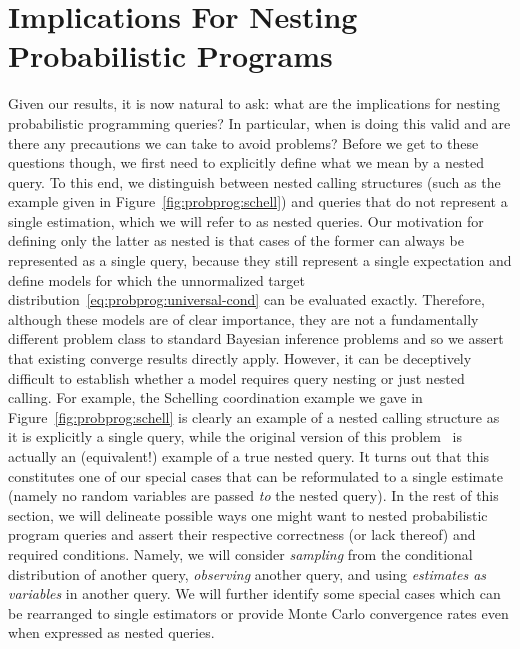 
\section{Implications For Nesting Probabilistic Programs}
\label{sec:nest:imp}

Given our results, it is now natural to ask: what are the implications for nesting probabilistic programming queries?
In particular, when is doing
this valid and are there any precautions we can take to avoid problems?  Before
we get to these questions though, we first need to explicitly define what we
mean by a nested query.  To this end, we distinguish between nested calling
structures (such as the example given in Figure~\ref{fig:probprog:schell}) and
queries that do not represent a single estimation, which we will refer
to as nested queries. Our motivation for defining only the latter
as nested is that cases of the former can always be represented as a single
query, because they still represent a single expectation and define models
for which the unnormalized target distribution~\eqref{eq:probprog:universal-cond}
 can be evaluated exactly.  Therefore, although these models are
of clear importance, they are not a fundamentally different problem class
to standard Bayesian inference problems and so we assert that existing \mc
converge results directly apply.  However, it can be deceptively difficult to establish
whether a model requires query nesting or just nested calling.
For example, the Schelling coordination example we gave in Figure~\ref{fig:probprog:schell}
is clearly an example of a nested calling structure as it is explicitly a single query,
while the original version of this problem~\cite[Figure 6]{stuhlmuller2014reasoning}
is actually an (equivalent!) example of a true nested query.  It turns out that this
constitutes one of our special cases that can be reformulated to a single estimate (namely
no random variables are passed \emph{to} the nested query).
In the rest of this section, we will delineate possible ways one might want
to nested probabilistic program queries and
assert their respective correctness (or lack thereof) and required conditions.
Namely, we will consider \emph{sampling} from the conditional distribution
of another query, \emph{observing} another query, and using \emph{estimates as variables}
in another query.  We will further identify some special cases which can be rearranged to single estimators or
provide Monte Carlo convergence rates even when expressed as nested queries.

